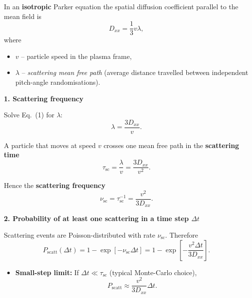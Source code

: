 \begin{tcolorbox}[colback=white, colframe=black, title={From Parker‐Equation Transport Coefficient $D_{xx}$ to a Monte-Carlo Scattering Probability}, fonttitle=\bfseries]

In an \textbf{isotropic} Parker equation the spatial diffusion coefficient parallel to the mean field is
\begin{equation}
D_{xx} = \frac{1}{3} v \lambda,
\tag{1}
\end{equation}
where
\begin{itemize}
  \item $v$ – particle speed in the plasma frame,
  \item $\lambda$ – \textit{scattering mean free path} (average distance travelled between independent pitch-angle randomisations).
\end{itemize}

\medskip

\textbf{1. Scattering frequency}

Solve Eq.~(1) for $\lambda$:
\[
\lambda = \frac{3 D_{xx}}{v}.
\]

A particle that moves at speed $v$ crosses one mean free path in the \textbf{scattering time}
\begin{equation}
\tau_{\text{sc}} = \frac{\lambda}{v} = \frac{3 D_{xx}}{v^2}.
\tag{2}
\end{equation}

Hence the \textbf{scattering frequency}
\begin{equation}
\nu_{\text{sc}} = \tau_{\text{sc}}^{-1} = \frac{v^2}{3 D_{xx}}.
\tag{3}
\end{equation}

\medskip

\textbf{2. Probability of at least one scattering in a time step $\Delta t$}

Scattering events are Poisson-distributed with rate $\nu_{\text{sc}}$. Therefore
\begin{equation}
\boxed{
P_{\text{scatt}}(\Delta t) = 1 - \exp\!\left[-\nu_{\text{sc}} \Delta t\right] = 1 - \exp\!\left[-\frac{v^2 \Delta t}{3 D_{xx}}\right]}.
\tag{4}
\end{equation}

\begin{itemize}
  \item \textbf{Small-step limit:} If $\Delta t \ll \tau_{\text{sc}}$ (typical Monte-Carlo choice),
  \[
  P_{\text{scatt}} \approx \frac{v^2}{3 D_{xx}} \Delta t.
  \]
  

\end{itemize}
\end{tcolorbox}
